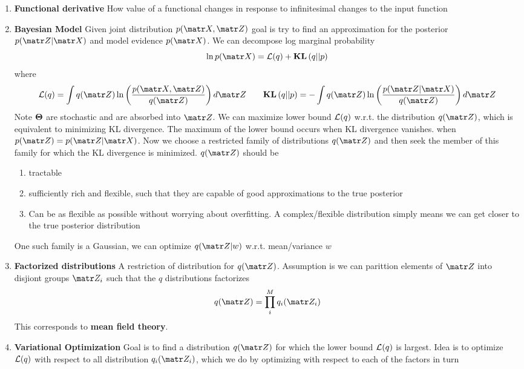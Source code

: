 \documentclass[11pt]{article}
\begin{document}
 
\begin{enumerate}
    \item \textbf{Functional derivative} How value of a functional changes in response to infinitesimal changes to the input function
    \item \textbf{Bayesian Model} Given joint distribution $p(\bX, \bZ)$ goal is try to find an approximation for the posterior $p(\bZ | \bX)$ and model evidence $p(\bX)$. We can decompose log marginal probability 
    \[
        \ln p(\bX) = \calL(q) + \kl{q}{p}
    \]
    where 
    \[
        \calL(q) = \int q(\bZ) \ln \left( \frac{p(\bX, \bZ)}{q(\bZ)} \right)  d\bZ 
        \qquad 
        \kl{q}{p} = - \int q(\bZ) \ln \left( \frac{p(\bZ | \bX)}{q(\bZ)} \right) d\bZ
    \]
    Note $\boldsymbol{\Theta}$ are stochastic and are absorbed into $\bZ$. We can maximize lower bound $\mathcal{L}(q)$ w.r.t. the distribution $q(\bZ)$, which is equivalent to minimizing KL divergence. The maximum of the lower bound occurs when KL divergence vanishes. when $p(\bZ) = p(\bZ | \bX)$. Now we choose a restricted family of distributions $q(\bZ)$ and then seek the member of this family for which the KL divergence is minimized. $q(\bZ)$ should be 
    \begin{enumerate}
        \item tractable 
        \item sufficiently rich and flexible, such that they are capable of good approximations to the true posterior
        \item Can be as flexible as possible without worrying about overfitting. A complex/flexible distribution simply means we can get closer to the true posterior distribution
    \end{enumerate}
    One such family is a Gaussian, we can optimize $q(\bZ | w)$ w.r.t. mean/variance $w$
    \item \textbf{Factorized distributions} A restriction of distribution for $q(\bZ)$. Assumption is we can parittion elements of $\bZ$ into disjiont groups $\bZ_i$ such that the $q$ distributions factorizes 
    \[
        q(\bZ) = \prod_i^M q_i(\bZ_i)  
    \]
    This corresponds to \textbf{mean field theory}. 
    \item \textbf{Variational Optimization} Goal is to find a distribution $q(\bZ)$ for which the lower bound $\mathcal{L}(q)$ is largest. Idea is to optimize $\mathcal{L}(q)$ with respect to all distribution $q_i(\bZ_i)$, which we do by optimizing with respect to each of the factors in turn
\end{enumerate}
\end{document}
